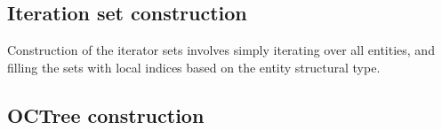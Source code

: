 \subsection{Iteration set construction}
\label{impl-grid-constructor-iterator}

Construction of the iterator sets involves simply iterating over all entities, and filling the sets with local indices based on the entity structural type.


\subsection{OCTree construction}
\label{impl-grid-constructor-octree}





























